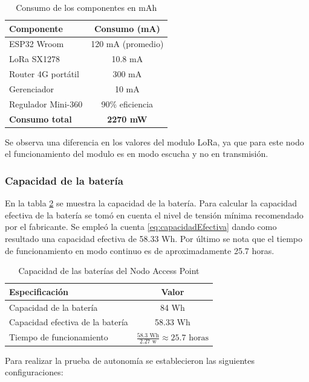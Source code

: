 \begin{table}[H]
    \centering

    \begin{tabular}{@{}lc@{}}
        \toprule
        \textbf{Componente}            & \textbf{Consumo (mA)} \\ \midrule
        ESP32 Wroom                   & 120 mA (promedio)      \\ 
        LoRa SX1278                   & 10.8 mA                  \\ 
        Router 4G portátil            & 300 mA                  \\ 
        Gerenciador                 & 10 mA                  \\ 
        Regulador Mini-360             & 90\% eficiencia                  \\ \midrule
        \textbf{Consumo total}        & \textbf{2270 mW}     \\ \bottomrule
    \end{tabular}
    \caption{Consumo de los componentes en mAh}
    \label{tab:consumosAP}
\end{table}

Se observa una diferencia en los valores del modulo LoRa, ya que para este nodo el funcionamiento del modulo es en modo escucha y no en transmisión.

\subsubsection{Capacidad de la batería}
En la tabla \ref{tab:capacidadBat} se muestra la capacidad de la batería. Para calcular la capacidad efectiva de la batería se tomó en cuenta el nivel de tensión mínima recomendado por el fabricante. Se empleó la cuenta \ref{eq:capacidadEfectiva} dando como resultado una capacidad efectiva de 58.33 Wh.
Por último se nota que el tiempo de funcionamiento en modo continuo es de aproximadamente 25.7 horas.
\begin{table}[H]
    \centering
    \begin{tabular}{@{}lc@{}}
        \toprule
        \textbf{Especificación}       & \textbf{Valor}          \\ \midrule
        Capacidad de la batería       & 84 Wh       \\ 
        Capacidad efectiva de la batería       & 58.33 Wh      \\ 
        Tiempo de funcionamiento  & $\frac{58.3 \text{ Wh}}{2.27 \text{ w}} \approx 25.7 \text{ horas}$ \\ \bottomrule
    \end{tabular}
    \caption{Capacidad de las baterías del Nodo Access Point}
    \label{tab:capacidadBat}
\end{table}
Para realizar la prueba de autonomía se establecieron las siguientes configuraciones:

